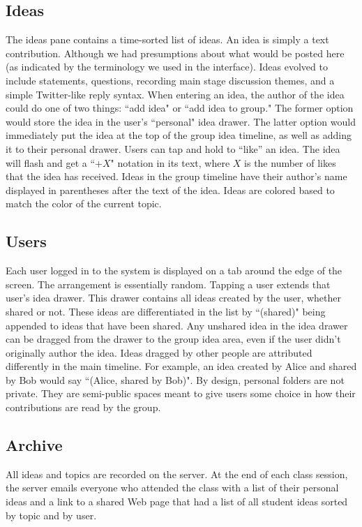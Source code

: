 \subsection{Ideas}
The ideas pane contains a time-sorted list of ideas. An idea is simply a text contribution. Although we had presumptions about what would be posted here (as indicated by the terminology we used in the interface). Ideas evolved to include statements, questions, recording main stage discussion themes, and a simple Twitter-like reply syntax. When entering an idea, the author of the idea could do one of two things: ``add idea" or ``add idea to group." The former option would store the idea in the user's ``personal" idea drawer.  The latter option would immediately put the idea at the top of the group idea timeline, as well as adding it to their personal drawer. Users can tap and hold to ``like'' an idea. The idea will flash and get a ``+$X$" notation in its text, where $X$ is the number of likes that the idea has received. Ideas in the group timeline have their author's name displayed in parentheses after the text of the idea. Ideas are colored based to match the color of the current topic. 

\subsection{Users}
Each user logged in to the system is displayed on a tab around the edge of the screen. The arrangement is essentially random. Tapping a user extends that user's idea drawer. This drawer contains all ideas created by the user, whether shared or not. These ideas are differentiated in the list by ``(shared)" being appended to ideas that have been shared. Any unshared idea in the idea drawer can be dragged from the drawer to the group idea area, even if the user didn't originally author the idea. Ideas dragged by other people are attributed differently in the main timeline. For example, an idea created by Alice and shared by Bob would say ``(Alice, shared by Bob)". By design, personal folders are not private.  They are semi-public spaces meant to give users some choice in how their contributions are read by the group.

\subsection{Archive}
All ideas and topics are recorded on the server. At the end of each class session, the server emails everyone who attended the class with a list of their personal ideas and a link to a shared Web page that had a list of all student ideas sorted by topic and by user.


